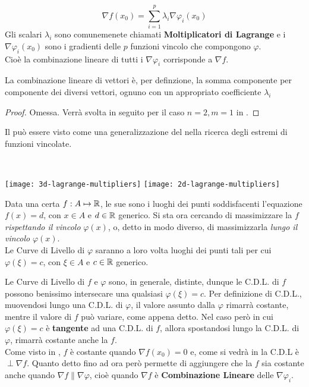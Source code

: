 \begin{theorem}
	\begin{equation}
		\label{eq:eqiv_nabl_molt_lagr}
		\nabla f(x_0) = \sum\limits_{i = 1}^{p} \lambda_i \nabla \varphi_i (x_0)
	\end{equation}
	Gli scalari $\lambda_i$ sono comunemenete chiamati \textbf{Moltiplicatori di Lagrange} e i $\nabla \varphi_i (x_0)$ sono i gradienti delle $p$ funzioni vincolo che compongono $\varphi$.\\
	Cioè la combinazione lineare di tutti i $\nabla \varphi_i$ corrisponde a $\nabla f$.
	\begin{note}
		La combinazione lineare di vettori è, per definzione, la somma componente per componente dei diversi vettori, ognuno con un appropriato coefficiente $\lambda_i$
	\end{note}
	\begin{proof}
		Omessa. Verrà svolta in seguito per il caso $n = 2, m = 1$ in .
	\end{proof}
\end{theorem}
\begin{observation}
	Il  può essere visto come una generalizzazione del  nella ricerca degli estremi di funzioni vincolate.
\end{observation}
\begin{observation}~
	\label{obs:concetto_teo_molt_lagr_gen}
	\begin{center}
		\texttt{[image: 3d-lagrange-multipliers]}
		\texttt{[image: 2d-lagrange-multipliers]}
	\end{center}
	Data una certa $f: A \mapsto \mathbb{R}$, le sue  sono i luoghi dei punti soddisfacenti l'equazione $f(x) = d$, con $x \in A$ e $d \in \mathbb{R}$ generico. Si sta ora cercando di massimizzare la $f$ \textit{rispettando il vincolo} $\varphi(x)$, o, detto in modo diverso, di massimizzarla \textit{lungo il vincolo} $\varphi(x)$.\\
	Le Curve di Livello di $\varphi$ saranno a loro volta luoghi dei punti tali per cui $\varphi(\xi) = c$, con $\xi \in A$ e $c \in \mathbb{R}$ generico.

	Le Curve di Livello di $f$ e $\varphi$ sono, in generale, distinte, dunque le C.D.L. di $f$ possono benissimo intersecare una qualsiasi $\varphi(\xi) = c$. Per definizione di C.D.L., muovendosi lungo una C.D.L. di $\varphi$, il valore assunto dalla $\varphi$ rimarrà costante, mentre il valore di $f$ può variare, come appena detto. Nel caso però in cui $\varphi(\xi) = c$ è \textbf{tangente} ad una C.D.L. di $f$, allora spostandosi lungo la C.D.L. di $\varphi$, rimarrà costante anche la $f$.\\
	Come visto in , $f$ è costante quando $\nabla f(x_0) = 0$ e, come si vedrà in  la C.D.L è $\perp \nabla f$. Quanto detto fino ad ora però permette di aggiungere che la $f$ sia costante anche quando $\nabla f \parallel \nabla \varphi$, cioè quando $\nabla f$ è \textbf{Combinazione Lineare} delle $\nabla \varphi_i$.
\end{observation}

